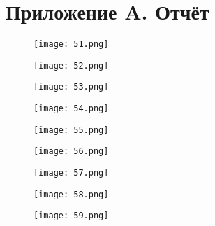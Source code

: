 \section*{Приложение A. Отчёт}
\begin{figure}[H]
	\centering
	\texttt{[image: 51.png]}
\end{figure}
\begin{figure}[H]
	\centering
	\texttt{[image: 52.png]}
\end{figure}
\begin{figure}[H]
	\centering
	\texttt{[image: 53.png]}
\end{figure}
\begin{figure}[H]
	\centering
	\texttt{[image: 54.png]}
\end{figure}
\begin{figure}[H]
	\centering
	\texttt{[image: 55.png]}
\end{figure}
\begin{figure}[H]
	\centering
	\texttt{[image: 56.png]}
\end{figure}
\begin{figure}[H]
	\centering
	\texttt{[image: 57.png]}
\end{figure}
\begin{figure}[H]
	\centering
	\texttt{[image: 58.png]}
\end{figure}
\begin{figure}[H]
	\centering
	\texttt{[image: 59.png]}
\end{figure}
